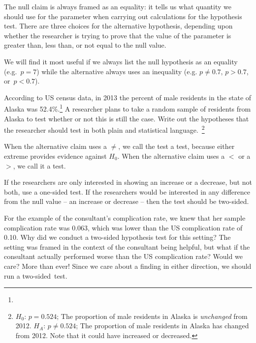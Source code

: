 The null claim is always framed as an equality: it tells us what quantity we should use for the parameter when carrying out calculations for the hypothesis test. There are three choices for the alternative hypothesis, depending upon whether the researcher is trying to prove that the value of the parameter is greater than, less than, or not equal to the null value.

\begin{tipBox}{
We will find it most useful if we always list the null hypothesis as an equality (e.g.~$p = 7$) while the alternative always uses an inequality (e.g. $p \neq 0.7$, $p>0.7$, or~$p<0.7$).}
\end{tipBox}

\begin{exercise}
According to US census data, in 2013 the percent of male residents in the state of Alaska was 52.4\%.\footnote{} A researcher plans to take a random sample of residents from Alaska to test whether or not this is still the case. Write out the hypotheses that the researcher should test in both plain and statistical language.~\footnote{$H_0$: $p=0.524$; The proportion of male residents in Alaska is \emph{unchanged} from 2012. $H_A$: $p \neq 0.524$; The proportion of male residents in Alaska has changed from 2012. Note that it could have increased or decreased.}
\end{exercise}

When the alternative claim uses a $\neq$, we call the test a  test, because either extreme provides evidence against $H_0$. When the alternative claim uses a $<$ or a $>$, we call it a  test.

\begin{tipBox}{
If the researchers are only interested in showing an increase or a decrease, but not both, use a one-sided test. If the researchers would be interested in any difference from the null value -- an increase or decrease -- then the test should be two-sided.\vspace{0.5mm}}
\end{tipBox}

\begin{example}{For the example of the consultant's complication rate, we knew that her sample complication rate was 0.063, which was lower than the US complication rate of 0.10. Why did we conduct a two-sided hypothesis test for this setting?}
The setting was framed in the context of the consultant being helpful, but what if the consultant actually performed worse than the US complication rate? Would we care? More than ever! Since we care about a finding in either direction, we should run a two-sided~test.
\end{example}

